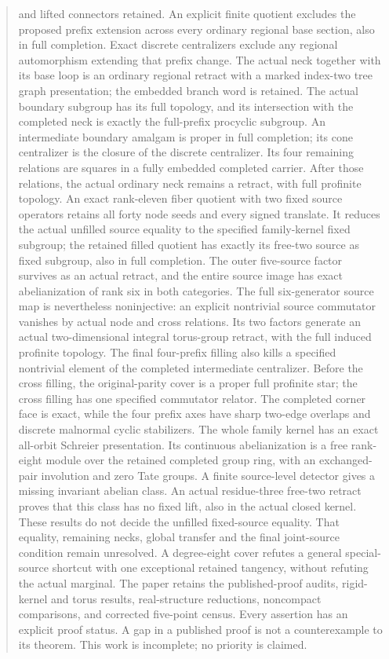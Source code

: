 \documentclass[11pt,a4paper]{article}
\begin{document}
\begin{abstract}
and lifted connectors retained. An explicit finite quotient excludes the proposed prefix extension
across every ordinary regional base section, also in full completion.
Exact discrete centralizers exclude any regional automorphism extending
that prefix change. The actual neck together with its base loop is an
ordinary regional retract with a marked index-two tree graph presentation;
the embedded branch word is retained. The actual boundary subgroup
has its full topology, and its intersection with the completed neck is
exactly the full-prefix procyclic subgroup. An intermediate boundary
amalgam is proper in full completion; its cone centralizer is the closure
of the discrete centralizer. Its four remaining relations are squares
in a fully embedded completed carrier. After those relations, the actual
ordinary neck remains a retract, with full profinite topology. An exact
rank-eleven fiber quotient with two fixed source operators retains all
forty node seeds and every signed translate. It reduces the actual
unfilled source equality to the specified family-kernel fixed subgroup;
the retained filled quotient has exactly its free-two source as fixed
subgroup, also in full completion. The outer five-source factor survives
as an actual retract, and the entire source image has exact abelianization
of rank six in both categories. The full six-generator source map is
nevertheless noninjective: an explicit nontrivial source commutator
vanishes by actual node and cross relations. Its two factors generate
an actual two-dimensional integral torus-group retract, with the full
induced profinite topology. The final four-prefix filling also kills a
specified nontrivial element of the completed intermediate centralizer.
Before the cross filling, the original-parity cover is a proper full
profinite star; the cross filling has one specified commutator relator.
The completed corner face is exact, while the four prefix axes have
sharp two-edge overlaps and discrete malnormal cyclic stabilizers.
The whole family kernel has an exact all-orbit Schreier presentation.
Its continuous abelianization is a free rank-eight module over the
retained completed group ring, with an exchanged-pair involution and
zero Tate groups. A finite source-level detector gives a missing
invariant abelian class. An actual residue-three free-two retract
proves that this class has no fixed lift, also in the actual closed
kernel. These results do not decide the unfilled fixed-source equality.
That equality, remaining necks, global transfer and the final joint-source
condition remain unresolved. A degree-eight cover refutes
a general special-source shortcut with one exceptional retained
tangency, without refuting the actual marginal. The paper retains the published-proof audits, rigid-kernel
and torus results, real-structure reductions, noncompact comparisons,
and corrected five-point census. Every assertion has an explicit proof
status. A gap in a published proof is not a counterexample to its theorem.
This work is incomplete; no priority is claimed.
\end{abstract}
\tableofcontents
\clearpage
\end{document}
